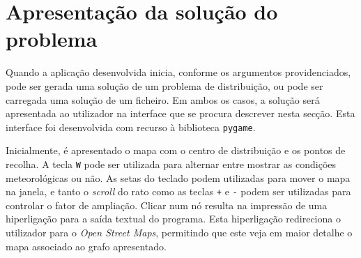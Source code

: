 \documentclass[12pt, a4paper, titlepage]{article}
\begin{document}
\section{Apresentação da solução do problema}

Quando a aplicação desenvolvida inicia, conforme os argumentos providenciados, pode ser gerada uma
solução de um problema de distribuição, ou pode ser carregada uma solução de um ficheiro. Em ambos
os casos, a solução será apresentada ao utilizador na interface que se procura descrever nesta
secção. Esta interface foi desenvolvida com recurso à biblioteca \texttt{pygame}.

Inicialmente, é apresentado o mapa com o centro de distribuição e os pontos de recolha. A tecla
\texttt{W} pode ser utilizada para alternar entre mostrar as condições meteorológicas ou não.
As setas do teclado podem utilizadas para mover o mapa na janela, e tanto o \emph{scroll} do rato
como as teclas \texttt{+} e \texttt{-} podem ser utilizadas para controlar o fator de ampliação.
Clicar num nó resulta na impressão de uma hiperligação para a saída textual do programa. Esta
hiperligação redireciona o utilizador para o \emph{Open Street Maps}, permitindo que este veja em
maior detalhe o mapa associado ao grafo apresentado.
\end{document}
